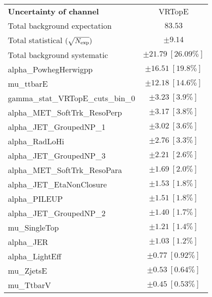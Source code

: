 
\begin{table}
\begin{center}
\setlength{\tabcolsep}{0.0pc}
\begin{tabular*}{\textwidth}{@{\extracolsep{\fill}}lc}
\noalign{\smallskip}\hline\noalign{\smallskip}
{\bf Uncertainty of channel}                                    & VRTopE            \\
\noalign{\smallskip}\hline\noalign{\smallskip}
Total background expectation             &  $83.53$       \\
\noalign{\smallskip}\hline\noalign{\smallskip}
Total statistical $(\sqrt{N_{\rm exp}})$              & $\pm 9.14$       \\
Total background systematic               & $\pm 21.79\ [26.09\%] $             \\
\noalign{\smallskip}\hline\noalign{\smallskip}
\noalign{\smallskip}\hline\noalign{\smallskip}
alpha\_PowhegHerwigpp         & $\pm 16.51\ [19.8\%] $       \\
mu\_ttbarE         & $\pm 12.18\ [14.6\%] $       \\
gamma\_stat\_VRTopE\_cuts\_bin\_0         & $\pm 3.23\ [3.9\%] $       \\
alpha\_MET\_SoftTrk\_ResoPerp         & $\pm 3.17\ [3.8\%] $       \\
alpha\_JET\_GroupedNP\_1         & $\pm 3.02\ [3.6\%] $       \\
alpha\_RadLoHi         & $\pm 2.76\ [3.3\%] $       \\
alpha\_JET\_GroupedNP\_3         & $\pm 2.21\ [2.6\%] $       \\
alpha\_MET\_SoftTrk\_ResoPara         & $\pm 1.69\ [2.0\%] $       \\
alpha\_JET\_EtaNonClosure         & $\pm 1.53\ [1.8\%] $       \\
alpha\_PILEUP         & $\pm 1.51\ [1.8\%] $       \\
alpha\_JET\_GroupedNP\_2         & $\pm 1.40\ [1.7\%] $       \\
mu\_SingleTop         & $\pm 1.21\ [1.4\%] $       \\
alpha\_JER         & $\pm 1.03\ [1.2\%] $       \\
alpha\_LightEff         & $\pm 0.77\ [0.92\%] $       \\
mu\_ZjetsE         & $\pm 0.53\ [0.64\%] $       \\
mu\_TtbarV         & $\pm 0.45\ [0.53\%] $       \\

\end{tabular*}
\end{center}
\end{table}

